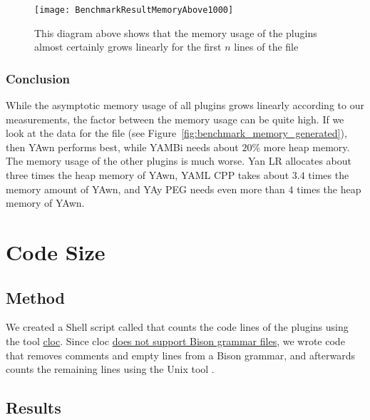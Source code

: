 \begin{figure}[H]
  \centering
    \texttt{[image: BenchmarkResultMemoryAbove1000]}
  \caption{This diagram above shows that the memory usage of the  plugins almost certainly grows linearly for the first $n$ lines of the file \FileGeneratedHundredThousand{}}
  \label{fig:benchmark_results_memory_lines_above_thousand}
\end{figure}

\subsubsection{Conclusion}

While the asymptotic memory usage of all plugins grows linearly according to our measurements, the factor between the memory usage can be quite high. If we look at the data for the file \FileGenerated{} (see Figure~\ref{fig:benchmark_memory_generated}), then YAwn performs best, while YAMBi needs about $20\%$ more heap memory. The memory usage of the other plugins is much worse. Yan LR allocates about three times the heap memory of YAwn, YAML CPP takes about $3.4$ times the memory amount of YAwn, and YAy PEG needs even more than $4$ times the heap memory of YAwn.

\section{Code Size}
\label{sec:code_size}

\subsection{Method}

\newcommand{\FileCountLines}{{%
%
}}

We created a Shell script called \FileCountLines{} that counts the code lines of the  plugins using the tool \href{https://github.com/AlDanial/cloc}{cloc}. Since cloc \href{http://cloc.sourceforge.net/#Languages}{does not support Bison grammar files}, we wrote code that removes comments and empty lines from a Bison grammar, and afterwards counts the remaining lines using the Unix tool .

\subsection{Results}

